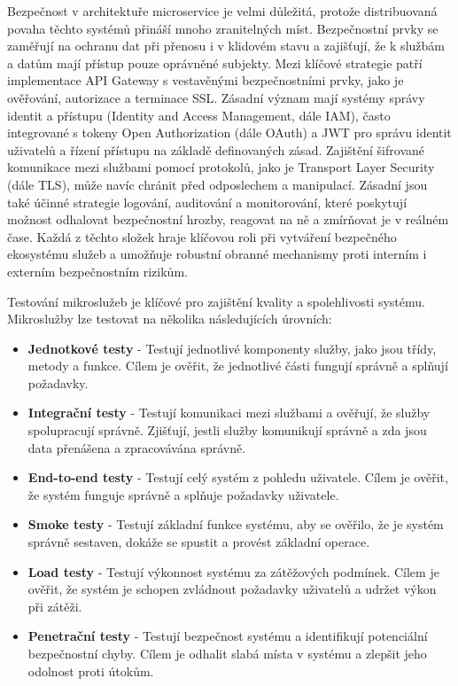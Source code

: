 
Bezpečnost v architektuře microservice je velmi důležitá, protože distribuovaná povaha těchto systémů přináší mnoho zranitelných míst. Bezpečnostní prvky se zaměřují na ochranu dat při přenosu i v klidovém stavu a zajišťují, že k službám a datům mají přístup pouze oprávněné subjekty. Mezi klíčové strategie patří implementace API Gateway s vestavěnými bezpečnostními prvky, jako je ověřování, autorizace a terminace SSL. Zásadní význam mají systémy správy identit a přístupu (Identity and Access Management, dále IAM), často integrované s tokeny Open Authorization (dále OAuth) a JWT pro správu identit uživatelů a řízení přístupu na základě definovaných zásad. Zajištění šifrované komunikace mezi službami pomocí protokolů, jako je Transport Layer Security (dále TLS), může navíc chránit před odposlechem a manipulací. Zásadní jsou také účinné strategie logování, auditování a monitorování, které poskytují možnost odhalovat bezpečnostní hrozby, reagovat na ně a zmírňovat je v reálném čase. Každá z těchto složek hraje klíčovou roli při vytváření bezpečného ekosystému služeb a umožňuje robustní obranné mechanismy proti interním i externím bezpečnostním rizikům.


Testování mikroslužeb je klíčové pro zajištění kvality a spolehlivosti systému. Mikroslužby lze testovat na několika následujících úrovních:

\begin{itemize}
    \item \textbf{Jednotkové testy} - Testují jednotlivé komponenty služby, jako jsou třídy, metody a funkce. Cílem je ověřit, že jednotlivé části fungují správně a splňují požadavky.
    \item \textbf{Integrační testy} - Testují komunikaci mezi službami a ověřují, že služby spolupracují správně. Zjišťují, jestli služby komunikují správně a zda jsou data přenášena a zpracovávána správně.
    \item \textbf{End-to-end testy} - Testují celý systém z pohledu uživatele. Cílem je ověřit, že systém funguje správně a splňuje požadavky uživatele.
    \item \textbf{Smoke testy} - Testují základní funkce systému, aby se ověřilo, že je systém správně sestaven, dokáže se spustit a provést základní operace.
    \item \textbf{Load testy} - Testují výkonnost systému za zátěžových podmínek. Cílem je ověřit, že systém je schopen zvládnout požadavky uživatelů a udržet výkon při zátěži.
    \item \textbf{Penetrační testy} - Testují bezpečnost systému a identifikují potenciální bezpečnostní chyby. Cílem je odhalit slabá místa v systému a zlepšit jeho odolnost proti útokům.
\end{itemize}

